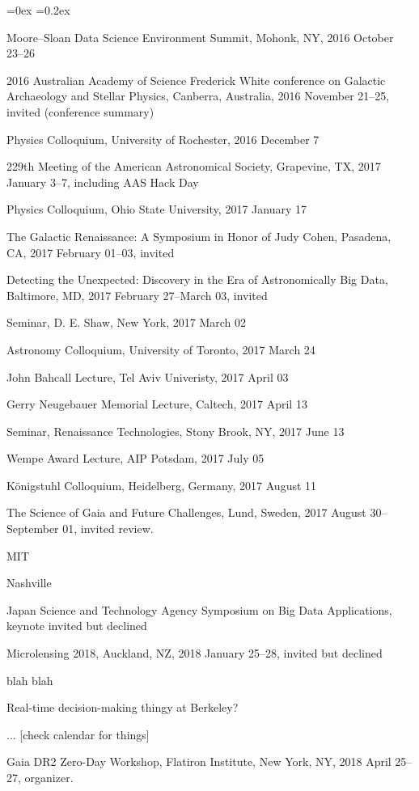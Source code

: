 \documentclass[12pt,letterpaper]{article}
\newcounter{refpubnum}
\newcommand{\hogglist}{%
    \rightmargin=0in
    \leftmargin=0.18in
    \topsep=0ex
    \partopsep=0pt
    \itemsep=0.2ex
    \parsep=0pt
    \itemindent=-1.0\leftmargin
    \listparindent=0.0\leftmargin
    \settowidth{\labelsep}{~}
    \usecounter{refpubnum}
  }
\begin{document}
\begin{list}{}{\hogglist}
{\item Moore--Sloan Data Science Environment Summit, Mohonk, NY, 2016 October 23--26
\item 2016 Australian Academy of Science Frederick White conference on Galactic Archaeology and Stellar Physics, Canberra, Australia, 2016 November 21--25, invited (conference summary)
\item Physics Colloquium, University of Rochester, 2016 December 7
\item 229th Meeting of the American Astronomical Society, Grapevine, TX, 2017 January 3--7, including AAS Hack Day
\item Physics Colloquium, Ohio State University, 2017 January 17
\item The Galactic Renaissance: A Symposium in Honor of Judy Cohen, Pasadena, CA, 2017 February 01--03, invited
\item Detecting the Unexpected: Discovery in the Era of Astronomically Big Data, Baltimore, MD, 2017 February 27--March 03, invited
\item Seminar, D. E. Shaw, New York, 2017 March 02
\item Astronomy Colloquium, University of Toronto, 2017 March 24
\item John Bahcall Lecture, Tel Aviv Univeristy, 2017 April 03
\item Gerry Neugebauer Memorial Lecture, Caltech, 2017 April 13
\item Seminar, Renaissance Technologies, Stony Brook, NY, 2017 June 13
\item Wempe Award Lecture, AIP Potsdam, 2017 July 05
\item K\"onigstuhl Colloquium, Heidelberg, Germany, 2017 August 11
\item The Science of Gaia and Future Challenges, Lund, Sweden, 2017 August 30--September 01, invited review.
\item MIT
\item Nashville
\item Japan Science and Technology Agency Symposium on Big Data Applications, keynote invited but declined
\item Microlensing 2018, Auckland, NZ, 2018 January 25--28, invited but declined
\item blah blah
\item Real-time decision-making thingy at Berkeley?
\item ... [check calendar for things]
\item Gaia DR2 Zero-Day Workshop, Flatiron Institute, New York, NY, 2018 April 25--27, organizer.
}
\end{list}
\end{document}
